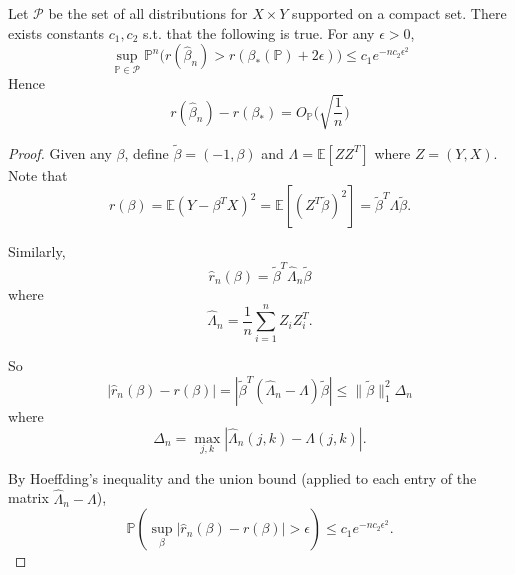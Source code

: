   \begin{theorem}
    Let $\mathcal{P}$ be the set of all distributions for $X \times Y$ supported on a compact set. There exists constants $c_1, c_2$ s.t. that the following is true. For any $\epsilon > 0$, 
    \begin{equation}
      \sup_{\mathbb{P} \in \mathcal{P}} \mathbb{P}^n \big( r(\hat{\beta}_n) > r (\beta_\ast (\mathbb{P}) + 2 \epsilon )\big) \leq c_1 e^{-n c_2 \epsilon^2}
    \end{equation}
    Hence 
    \begin{equation}
      r(\hat{\beta}_n ) - r(\beta_\ast) = O_{\mathbb{P}} \bigg( \sqrt{\frac{1}{n}} \bigg)
    \end{equation}
  \end{theorem} 
  \begin{proof}
    Given any $\beta$, define $\tilde{\beta} = (-1, \beta)$ and $\Lambda = \mathbb{E}[ZZ^T]$ where $Z = (Y, X)$. Note that
    \begin{equation}
     r(\beta) = \mathbb{E}(Y - \beta^T X)^2 = \mathbb{E}[(Z^T \tilde{\beta})^2] = \tilde{\beta}^T \Lambda \tilde{\beta}.
    \end{equation}

    Similarly,
    \begin{equation}
     \hat{r}_n(\beta) = \tilde{\beta}^T \hat{\Lambda}_n \tilde{\beta}
    \end{equation}
    where
    \begin{equation}
     \hat{\Lambda}_n = \frac{1}{n} \sum_{i=1}^n Z_i Z_i^T.
    \end{equation}

    So
    \begin{equation}
     |\hat{r}_n(\beta) - r(\beta)| = |\tilde{\beta}^T (\hat{\Lambda}_n - \Lambda) \tilde{\beta}| \leq \|\tilde{\beta}\|_1^2 \Delta_n
    \end{equation}
    where
    \begin{equation}
     \Delta_n = \max_{j,k} |\hat{\Lambda}_n(j,k) - \Lambda(j,k)|.
    \end{equation}

    By Hoeffding's inequality and the union bound (applied to each entry of the matrix $\hat{\Lambda}_n - \Lambda$),
    \begin{equation}
     \mathbb{P}\left(\sup_{\beta} |\hat{r}_n(\beta) - r(\beta)| > \epsilon\right) \leq c_1 e^{-n c_2 \epsilon^2}.
    \end{equation}


\end{proof}
